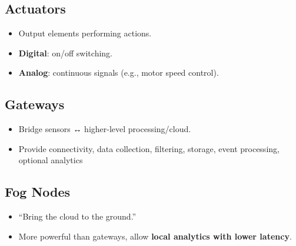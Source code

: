 \documentclass[a4paper, 12pt]{book} %
\begin{document}
\subsection{Actuators}\label{actuators}

\begin{itemize}
\tightlist
\item
  Output elements performing actions.
\item
  \textbf{Digital}: on/off switching.
\item
  \textbf{Analog}: continuous signals (e.g., motor speed control).
\end{itemize}

\subsection{Gateways}\label{gateways}

\begin{itemize}
\tightlist
\item
  Bridge sensors ↔ higher-level processing/cloud.
\item
  Provide connectivity, data collection, filtering, storage, event
  processing, optional analytics
\end{itemize}

\subsection{Fog Nodes}\label{fog-nodes}

\begin{itemize}
\tightlist
\item
  ``Bring the cloud to the ground.''
\item
  More powerful than gateways, allow \textbf{local analytics with lower
  latency}.
\end{itemize}
\end{document}
